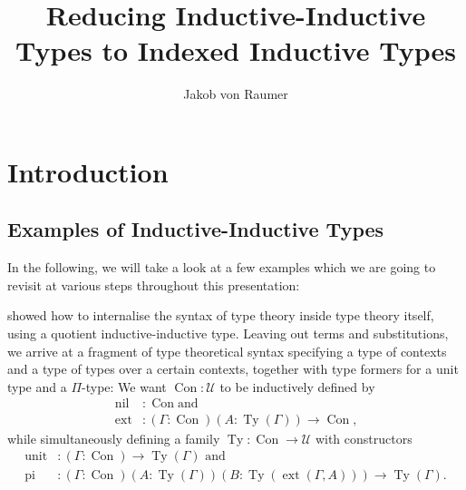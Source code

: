 \documentclass[12pt,headings=optiontohead,openany,oneside,a4paper]{book}
\theoremstyle{definition}
\newcommand{\UU}{\mathcal{U}}
\begin{document}
\title{Reducing Inductive-Inductive Types to Indexed Inductive Types}
\author{Jakob von Raumer}

\frontmatter
\maketitle

\tableofcontents

\mainmatter

\chapter{Introduction}

\section{Examples of Inductive-Inductive Types}

In the following, we will take a look at a few examples which we are going to
revisit at various steps throughout this presentation:

\begin{example}\label{ex:ttintt}
\cite{ttintt} showed how to internalise the syntax of type theory inside type
theory itself, using a quotient inductive-inductive type.
Leaving out terms and substitutions, we arrive at a fragment of type theoretical
syntax specifying a type of contexts and a type of types over a certain contexts,
together with type formers for a unit type and a $\Pi$-type:
We want $\mathop{Con} : \UU$ to be inductively defined by
\begin{align*}
\mathop{nil}	&: \mathop{Con} \text{and } \\
\mathop{ext}	&: (\Gamma : \mathop{Con})(A : \mathop{Ty}(\Gamma)) \to \mathop{Con} \text{,}
\end{align*}
while simultaneously defining a family $\mathop{Ty} : \mathop{Con} \to \UU$ with constructors
\begin{align*}
\mathop{unit}	&: (\Gamma : \mathop{Con}) \to \mathop{Ty}(\Gamma) \text{ and} \\
\mathop{pi}	&: (\Gamma : \mathop{Con})(A : \mathop{Ty}(\Gamma))(B : \mathop{Ty}(\mathop{ext}(\Gamma, A))) \to \mathop{Ty}(\Gamma) \text{.}
\end{align*}
\end{example}
\end{document}
